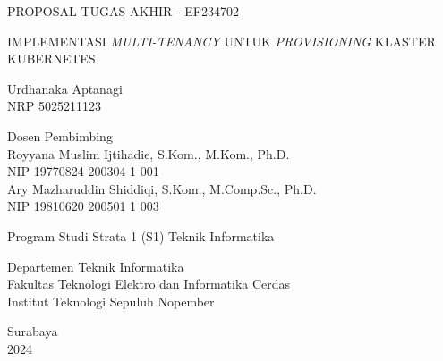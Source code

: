 \begin{large}
  PROPOSAL TUGAS AKHIR - EF234702
\end{large}

\vspace{\fill}

\begin{spacing}{1.5}
  \begin{Large}
    IMPLEMENTASI \emph{MULTI-TENANCY} UNTUK
    \emph{PROVISIONING} KLASTER KUBERNETES 
  \end{Large}
\end{spacing}

\vspace{\fill}

\begin{large}
  Urdhanaka Aptanagi \\
  \textmd{NRP 5025211123}
\end{large}

\vspace{\fill}

\begin{large}
  \textmd{Dosen Pembimbing} \\
  Royyana Muslim Ijtihadie, S.Kom., M.Kom., Ph.D. \\
  \textmd{NIP 19770824 200304 1 001} \\
  Ary Mazharuddin Shiddiqi, S.Kom., M.Comp.Sc., Ph.D. \\
  \textmd{NIP 19810620 200501 1 003}
\end{large}

\vspace{\fill}

Program Studi Strata 1 (S1) Teknik Informatika \\

\mdseries

Departemen Teknik Informatika \\
Fakultas Teknologi Elektro dan Informatika Cerdas \\
Institut Teknologi Sepuluh Nopember

Surabaya \\
2024
